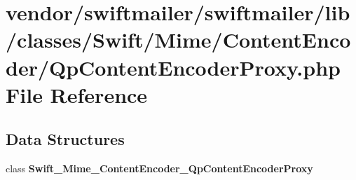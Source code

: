 \section{vendor/swiftmailer/swiftmailer/lib/classes/\+Swift/\+Mime/\+Content\+Encoder/\+Qp\+Content\+Encoder\+Proxy.php File Reference}
\label{_qp_content_encoder_proxy_8php}
\subsection*{Data Structures}
\begin{DoxyCompactItemize}
\item 
class {\bf Swift\+\_\+\+Mime\+\_\+\+Content\+Encoder\+\_\+\+Qp\+Content\+Encoder\+Proxy}
\end{DoxyCompactItemize}

